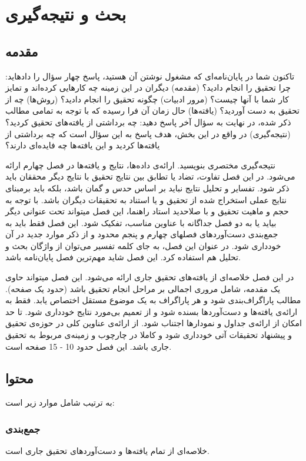 \mainchapterstyle
\chapter{بحث و نتیجه‌گیری}
\pagestyle{mainheader}

\section{مقدمه}
تاکنون شما در پایان‌نامه‌ای که مشغول نوشتن آن هستید، پاسخ چهار سؤال را دادهاید:
چرا تحقیق را انجام دادید؟ (مقدمه)
دیگران در این زمینه چه کارهایی کرده‌اند و تمایز کار شما با آنها چیست؟ (مرور ادبیات)
چگونه تحقیق را انجام دادید؟ (روش‌ها)
چه از تحقیق به دست آوردید؟ (یافته‌ها)
حال زمان آن فرا رسیده که با توجه به تمامی مطالب ذکر شده، در نهایت به سؤال آخر پاسخ دهید:
چه برداشتی از یافته‌های تحقیق کردید؟ (نتیجه‌گیری)
در واقع در این بخش، هدف پاسخ به این سؤال است که چه برداشتی از یافته‌ها کردید و این یافته‌ها چه
فایده‌ای دارند؟

نتیجه‌گیری مختصری بنویسید. ارائه‌ی داده‌ها، نتایج و یافته‌ها در فصل چهارم ارائه می‌شود. در این فصل
تفاوت، تضاد یا تطابق بین نتایج تحقیق با نتایج دیگر محققان باید ذکر شود. تفسایر و تحلیل نتایج نباید بر
اساس حدس و گمان باشد، بلکه باید برمبنای نتایج عملی استخراج شده از تحقیق و یا استناد به تحقیقات
دیگران باشد. با توجه به حجم و ماهیت تحقیق و با صلاحدید استاد راهنما، این فصل میتواند تحت عنوانی
دیگر بیاید یا به دو فصل جداگانه با عناوین مناسب، تفکیک شود. این فصل فقط باید به جمع‌بندی
دست‌آوردهای فصلهای چهارم و پنجم محدود و از ذکر موارد جدید در آن خودداری شود. در عنوان این فصل، به جای کلمه تفسیر می‌توان از واژگان بحث و تحلیل هم استفاده کرد. این فصل شاید مهم‌ترین فصل پایان‌نامه باشد.

در این فصل خلاصه‌ای از یافته‌های تحقیق جاری ارائه می‌شود. این فصل میتواند حاوی یک مقدمه،
شامل مروری اجمالی بر مراحل انجام تحقیق باشد (حدود یک صفحه). مطالب پاراگراف‌بندی شود و هر
پاراگراف به یک موضوع مستقل اختصاص یابد. فقط به ارائه‌ی یافته‌ها و دست‌آوردها بسنده شود و از تعمیم
بی‌مورد نتایج خودداری شود. تا حد امکان از ارائه‌ی جداول و نمودارها اجتناب شود. از ارائه‌ی عناوین کلی در
حوزه‌ی تحقیق و پیشنهاد تحقیقات آتی خودداری شود و کاملا در چارچوب و زمینه‌ی مربوط به تحقیق جاری
باشد. این فصل حدود 10 - 15 صفحه است.

\section{محتوا}
به ترتیب شامل موارد زیر است:

\subsection{جمع‌بندی}
خلاصه‌ای از تمام یافته‌ها و دست‌آوردهای تحقیق جاری است.

